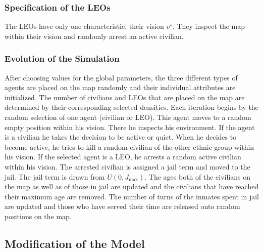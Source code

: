 \documentclass[11pt]{article}
\begin{document}
\subsubsection{Specification of the LEOs}
The LEOs have only one characteristic, their vision $v^\star$. They inspect the map within their vision and randomly arrest an active civilian.

\subsubsection{Evolution of the Simulation}
After choosing values for the global parameters, the three different types of agents are placed on the map randomly and their individual attributes are initialized. The number of civilians and LEOs that are placed on the map are determined by their corresponding selected densities. Each iteration begins by the random selection of one agent (civilian or LEO). This agent moves to a random empty position within his vision. There he inspects his environment. If the agent is a civilian he takes the decision to be active or quiet. When he decides to become active, he tries to kill a random civilian of the other ethnic group within his vision. If the selected agent is a LEO, he arrests a random active civilian within his vision. The arrested civilian is assigned a jail term and moved to the jail. The jail term is drawn from $U(0,J_{\text{max}})$. The ages both of the civilians on the map as well as of those in jail are updated and the civilians that have reached their maximum age are removed. The number of turns of the inmates spent in jail are updated and those who have served their time are released onto random positions on the map.

\subsection{Modification of the Model \cite{Epstein2002,Bennett2008,Bhavnani2000}}
\end{document}
